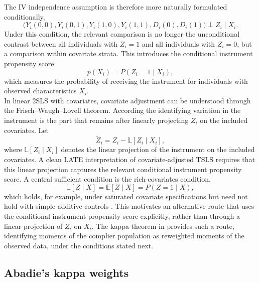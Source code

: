 \documentclass[12pt, a4paper, oneside]{article}
\theoremstyle{plain}
\theoremstyle{definition}
\begin{document}
The IV independence assumption is therefore more naturally formulated conditionally,
\begin{equation}
\big(Y_i(0,0),Y_i(0,1),Y_i(1,0),Y_i(1,1),D_i(0),D_i(1)\big)
\perp Z_i \mid X_i .
\end{equation}
Under this condition, the relevant comparison is no longer the unconditional contrast between all individuals with $Z_i=1$ and all individuals with $Z_i=0$, but a comparison within covariate strata. This introduces the conditional instrument propensity score
\begin{equation}
    p(X_i)=P(Z_i=1\mid X_i),
\end{equation}
which measures the probability of receiving the instrument for individuals with observed characteristics $X_i$.\\
In linear 2SLS with covariates, covariate adjustment can be understood through the
Frisch--Waugh--Lovell theorem. According the identifying variation in the instrument is the part
that remains after linearly projecting \(Z_i\) on the included covariates. Let
\begin{equation}
    \tilde Z_i = Z_i - \mathbb{L}[Z_i\mid X_i],
\end{equation}
where \(\mathbb{L}[Z_i\mid X_i]\) denotes the linear projection of the instrument on the
included covariates. A clean LATE interpretation of covariate-adjusted TSLS requires that this linear projection
captures the relevant conditional instrument propensity score. A central sufficient condition
is the rich-covariates condition,
\begin{equation}
    \mathbb{L}[Z\mid X] = \mathbb{E}[Z\mid X] = P(Z=1\mid X),
\end{equation}
which holds, for example, under saturated covariate specifications but need not hold with
simple additive controls \citep{blandhol2022tsls}.
This motivates an alternative route that uses the conditional instrument propensity score explicitly, rather than through a linear projection of $Z_i$ on $X_i$. The kappa theorem in \citet{abadie2003semiparametric} provides such a route, identifying moments of the complier population as reweighted moments of the observed data, under the conditions stated next.

\subsection{Abadie's kappa weights}
\end{document}
